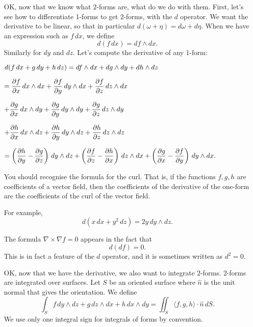 \documentclass[12pt]{article}
\begin{document}
OK, now that we know what $2$-forms are, what do we do with them.
First, let's see how to differentiate 1-forms to get 2-forms,
with the $d$ operator.
We want the derivative to be linear, so that in particular
$d(\omega + \eta)= d\omega + d\eta$.  When we have an expression such
as $f \, dx$, we define
$$
d(f \, dx) = df \wedge dx .
$$
Similarly for $dy$ and $dz$.  Let's compute the derivative of
any 1-form:

$
\displaystyle
d ( f \, dx + g \, dy + h \, dz ) = 
df \wedge dx + dg \wedge dy + dh \wedge dz
\hfill
$

$
\displaystyle
\hfill
=
\frac{\partial f}{\partial x} \, dx \wedge dx
+
\frac{\partial f}{\partial y} \, dy \wedge dx
+
\frac{\partial f}{\partial z} \, dz \wedge dx
\hfill
$

$
\displaystyle
\hfill
\hfill
+
\frac{\partial g}{\partial x} \, dx \wedge dy
+
\frac{\partial g}{\partial y} \, dy \wedge dy
+
\frac{\partial g}{\partial z} \, dz \wedge dy
\hfill
$

$
\displaystyle
\hfill
\hfill
+
\frac{\partial h}{\partial x} \, dx \wedge dz
+
\frac{\partial h}{\partial y} \, dy \wedge dz
+
\frac{\partial h}{\partial z} \, dz \wedge dz
\hfill
$

$
\displaystyle
\hfill
=
\left( \frac{\partial h}{\partial y} - \frac{\partial g}{\partial z} \right) \, dy \wedge dz
+
\left( \frac{\partial f}{\partial z} - \frac{\partial h}{\partial x} \right) \, dz \wedge dx
+
\left( \frac{\partial g}{\partial x} - \frac{\partial f}{\partial y} \right)
\, dy \wedge dx .
$

You should recognise the formula for the curl.  That is, if the functions
$f,g,h$ are coefficients of a vector field, then the 
coefficients of the derivative of the one-form
are the coefficients of the curl of the vector field.

For example,
$$
d( x \, dx + y^2 \, dz)
=
2 y \, dy \wedge dz .
$$

The formula $\nabla \times \nabla f = 0$ appears in the fact that
$$
d(df) = 0 .
$$
This is in fact a feature of the $d$ operator, and it is sometimes
written as $d^2 = 0$.

OK, now that we have the derivative, we also want to integrate $2$-forms.
$2$-forms are integrated over surfaces.  Let $S$ be an oriented surface
where $\hat{n}$ is the unit normal that gives the orientation.
We define
$$
\int_S
f\, dy \wedge dz + 
g\, dz \wedge dx +
h\, dx \wedge dy
=
\iint_S \langle f, g, h \rangle \cdot \hat{n} \, dS .
$$
We use only one integral sign for integrals of forms by convention.
\end{document}
